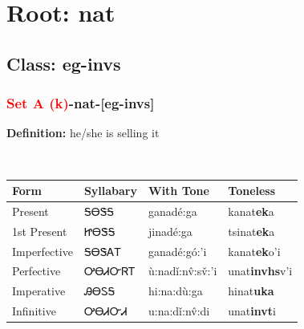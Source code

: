 \needspace{4in}
\section*{Root: nat}
\nopagebreak
{}
\needspace{3in}
\subsection*{Class: eg-invs}
\nopagebreak
\needspace{2in}
\subsubsection*{\textcolor{Red}{Set A (k)}{-}\textbf{nat}{-}[eg-invs]}
\nopagebreak
\textbf{Definition: } he/she is selling it
\\[0.5em]
\begin{tabularx}{\textwidth}{l X X X}%
\toprule%
\textbf{Form}&\textbf{Syllabary}&\textbf{With Tone}&\textbf{Toneless}\\%
\midrule%
Present&ᎦᎾᏕᎦ&ganadé:ga&kanat\textbf{ek}a\\%
1st Present&ᏥᎾᏕᎦ&jinadé:ga&tsinat\textbf{ek}a\\%
Imperfective&ᎦᎾᏕᎪᎢ&ganadé:gó:’i&kanat\textbf{ek}o'i\\%
Perfective&ᎤᎾᏗᏅᏒᎢ&ù:nadǐ:nv̂:sv̌:’i&unat\textbf{invhs}v'i\\%
Imperative&ᎯᎾᏚᎦ&hi:na:dù:ga&hinat\textbf{uka}\\%
Infinitive&ᎤᎾᏗᏅᏗ&u:na:dǐ:nv̂:di&unat\textbf{invt}i\\%
\bottomrule%
\end{tabularx}
\\[1em]